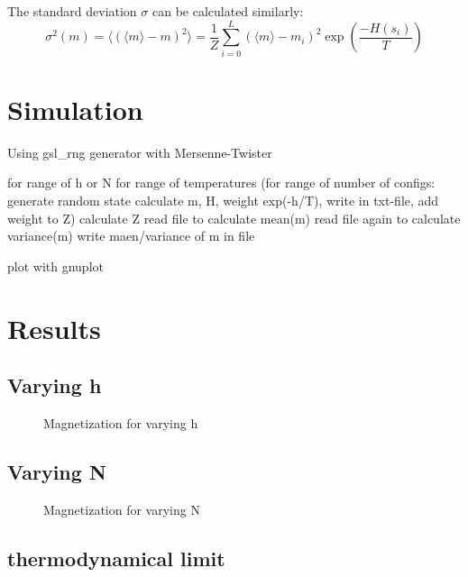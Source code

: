 \documentclass{scrartcl}
\begin{document}
The standard deviation $\sigma$ can be calculated similarly:
\[\sigma^2(m)=\langle(\langle m\rangle-m)^2\rangle=\frac{1}{Z}\sum_{i=0}^{L}(\langle m\rangle-m_i)^2\exp\left( \frac{-H(s_i)}{T}\right) \]



\section{Simulation}
Using gsl\_rng generator with Mersenne-Twister\cite{gsldoc}

for range of h or N
for range of temperatures
(for range of number of configs:
generate random state
calculate m, H, weight exp(-h/T), write in txt-file, add weight to Z)
calculate Z
read file to calculate mean(m)
read file again to calculate variance(m)
write maen/variance of m in file

plot with gnuplot

\section{Results}
\label{sec:results}
\subsection{Varying h}

	\begin{figure}[htbp]
		
		\caption{Magnetization for varying h}
		\label{fig:magvarh}
	\end{figure}
	
\subsection{Varying N}

	\begin{figure}[htbp]
		
		\caption{Magnetization for varying N}
		\label{fig:magvarN}
	\end{figure}
	
\subsection{thermodynamical limit}

	
%	
	
\newpage	
\listoffigures
\printbibliography
\end{document}
